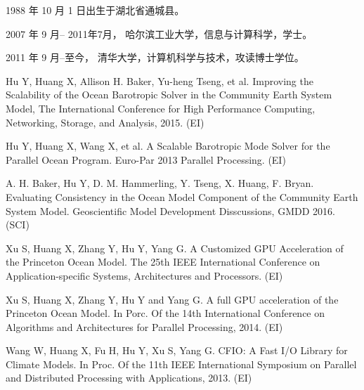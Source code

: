 \begin{resume}


  1988 年 10 月 1 日出生于湖北省通城县。

  2007 年 9 月-- 2011年7月， 哈尔滨工业大学，信息与计算科学，学士。

  2011 年 9 月--至今， 清华大学，计算机科学与技术，攻读博士学位。


  \begin{publications}
    \item Hu Y, Huang X, Allison H. Baker, Yu-heng Tseng, et al. Improving the Scalability of the Ocean Barotropic Solver in the Community Earth System Model, The International Conference for High Performance Computing, Networking, Storage, and Analysis, 2015.  (EI)
    \item Hu Y, Huang X, Wang X, et al. A Scalable Barotropic Mode Solver for the Parallel Ocean Program. Euro-Par 2013 Parallel Processing. (EI) 
  \end{publications}

  \begin{publications}[before=\publicationskip,after=\publicationskip]
    \item A. H. Baker, Hu Y, D. M. Hammerling, Y. Tseng, X. Huang, F. Bryan. Evaluating Consistency in the Ocean Model Component of the Community Earth System Model. Geoscientific Model Development Disscussions, GMDD 2016. (SCI)
  \end{publications}

  \begin{publications}
    \item Xu S, Huang X, Zhang Y, Hu Y, Yang G. A Customized GPU Acceleration of the Princeton Ocean Model. The 25th IEEE International Conference on Application-specific Systems, Architectures and Processors. (EI)
    \item Xu S, Huang X, Zhang Y, Hu Y and Yang G. A full GPU acceleration of the Princeton Ocean Model. In Porc. Of the 14th International Conference on Algorithms and Architectures for Parallel Processing, 2014. (EI)
    \item Wang W, Huang X, Fu H, Hu Y, Xu S, Yang G. CFIO: A Fast I/O Library for Climate Models. In Proc. Of the 11th IEEE International Symposium on Parallel and Distributed Processing with Applications, 2013. (EI)

  \end{publications}


\end{resume}

